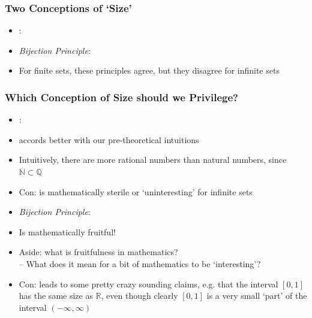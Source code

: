 \begin{frame}
\frametitle{Two Conceptions of `Size'}

\begin{itemize}[<+->]

\item {}:

\item \emph{Bijection Principle}: 

\item For finite sets, these principles agree, but they disagree for infinite sets

\end{itemize}
\end{frame}

\begin{frame}
\frametitle{Which Conception of Size should we Privilege?}

\begin{itemize}[<+->]

\item {}:
\bi
\item accords better with our pre-theoretical intuitions

\item Intuitively, there are more rational numbers than natural numbers, since $\mathbb{N} \subset \mathbb{Q}$

\item Con: is mathematically sterile or `uninteresting' for infinite sets

\ei

\item \emph{Bijection Principle}:
\bi

\item Is mathematically fruitful! 

\item Aside: what is fruitfulness in mathematics? \\ -- What does it mean for a bit of mathematics to be `interesting'?

\item Con: leads to some pretty crazy sounding claims, e.g. that the interval $[0, 1]$ has the same size as $\mathbb{R}$, even though clearly $[0,1]$ is a very small `part' of the interval $(-\infty, \infty)$

\ei

\end{itemize}
\end{frame}

